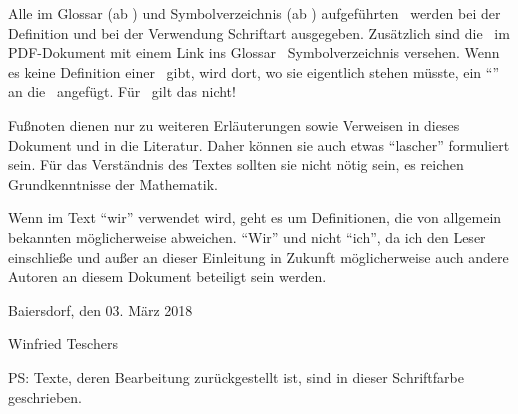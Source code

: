 Alle im Glossar (ab ) und Symbolverzeichnis (ab ) aufgeführten \Bezeichnungen\ werden bei der Definition  und bei der Verwendung  Schriftart ausgegeben.
Zusätzlich sind die \Bezeichnungen\ im PDF-Dokument mit einem Link ins Glossar \textbzw\ Symbolverzeichnis versehen.
Wenn es keine Definition einer \Benennung\ gibt, wird dort, wo sie eigentlich stehen müsste, ein "`\GD"' an die \Benennung\ angefügt.
Für \Symbole\ gilt das nicht!

Fußnoten dienen nur zu weiteren Erläuterungen sowie Verweisen in dieses Dokument und in die Literatur.
Daher können sie auch etwas "`lascher"' formuliert sein.
Für das Verständnis des Textes sollten sie nicht nötig sein, es reichen Grundkenntnisse der Mathematik.

Wenn im Text "`wir"' verwendet wird, geht es um Definitionen, die von allgemein bekannten möglicherweise abweichen.
"`Wir"' und nicht "`ich"', da ich den Leser einschließe und außer an dieser Einleitung in Zukunft möglicherweise auch andere Autoren an diesem Dokument beteiligt sein werden.

\bigskip

Baiersdorf, den 03. März 2018

Winfried Teschers

\iftestFlg
	\bigskip
	\color{gray}%
	PS: Texte, deren Bearbeitung zurückgestellt ist, sind in dieser Schriftfarbe geschrieben.
	\color{black}%
\else\fi
